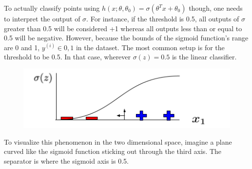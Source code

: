 \documentclass{article}
\begin{document}
    To actually classify points using $h(x; \theta, \theta_0)=\sigma(\theta^Tx+\theta_0)$ though, one needs to interpret the output of $\sigma$. For instance, if the threshold is 0.5, all outputs of $\sigma$ greater than 0.5 will be considered +1 whereas all outputs less than or equal to 0.5 will be negative. However, because the bounds of the sigmoid function's range are 0 and 1, $y^{(i)}\in{0,1}$ in the dataset. The most common setup is for the threshold to be 0.5. In that case, wherever $\sigma(z)=0.5$ is the linear classifier.

    \begin{figure}[H]
        \centering
        \includegraphics[width=0.5\linewidth]{Classifier Using Sigmoid Function.png}
    \end{figure}

    To visualize this phenomenon in the two dimensional space, imagine a plane curved like the sigmoid function sticking out through the third axis. The separator is where the sigmoid axis is 0.5.
\end{document}
